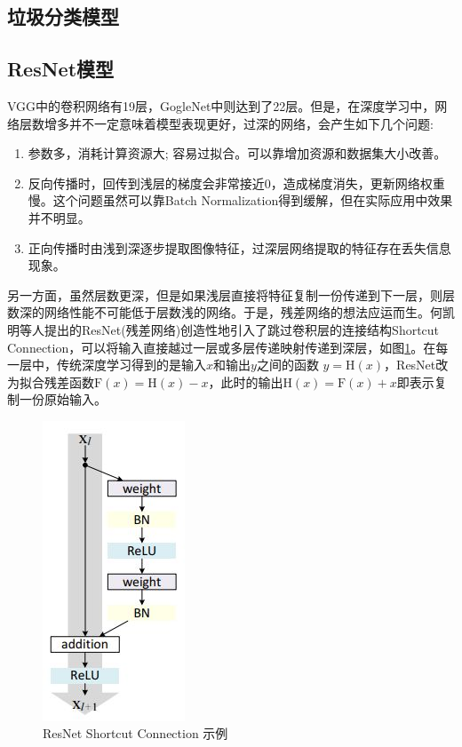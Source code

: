 \documentclass[a4paper]{article}
\begin{document}
\begin{CJK*}{UTF8}{gbsn}
\section{垃圾分类模型}
\subsection{ResNet模型}

VGG中的卷积网络有19层，GogleNet中则达到了22层。但是，在深度学习中，网络层数增多并不一定意味着模型表现更好，过深的网络，会产生如下几个问题:

\begin{enumerate}
    \item 参数多，消耗计算资源大; 容易过拟合。可以靠增加资源和数据集大小改善。
    \item 反向传播时，回传到浅层的梯度会非常接近0，造成梯度消失，更新网络权重慢。这个问题虽然可以靠Batch Normalization得到缓解，但在实际应用中效果并不明显。
    \item 正向传播时由浅到深逐步提取图像特征，过深层网络提取的特征存在丢失信息现象。
\end{enumerate}

另一方面，虽然层数更深，但是如果浅层直接将特征复制一份传递到下一层，则层数深的网络性能不可能低于层数浅的网络。于是，残差网络的想法应运而生。何凯明等人提出的ResNet(残差网络)\cite{he2016deep}创造性地引入了跳过卷积层的连接结构Shortcut Connection，可以将输入直接越过一层或多层传递映射传递到深层，如图\ref{fig:resident_block}。在每一层中，传统深度学习得到的是输入$x$和输出$y$之间的函数 $y=\mathrm{H}(x)$，ResNet改为拟合残差函数$\mathrm{F}(x)=\mathrm{H}(x)-x$，此时的输出$\mathrm{H}(x)=\mathrm{F}(x)+x$即表示复制一份原始输入。

\begin{figure}[h!]
\centering
\includegraphics[scale=0.5]{resident-block.jpg}
\caption{ResNet Shortcut Connection 示例}
\label{fig:resident_block}
\end{figure}


\end{CJK*}
\end{document}
